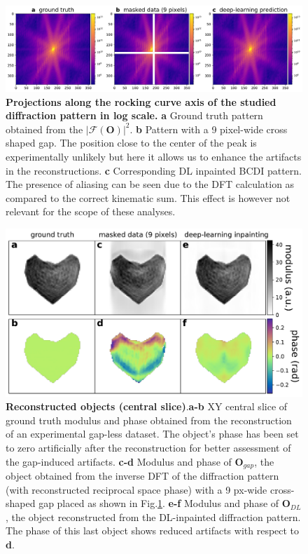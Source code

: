 \begin{figure}[H]
    \centering
    \includegraphics[width=\textwidth]{figures/Inpainting/Carnis_Diffractions_comparison_9px_version2.pdf}
    \caption{\textbf{Projections along the rocking curve axis of the studied diffraction pattern in log scale.} \textbf{a} Ground truth
    pattern obtained from the $|\mathcal{F}(\mathbf{O})|^2$. \textbf{b} Pattern with a 9 pixel-wide cross shaped gap. The position close to the center of 
    the peak is experimentally unlikely but here it allows us to enhance the artifacts in the reconstructions. \textbf{c} 
    Corresponding DL inpainted BCDI pattern. The presence of aliasing can be seen  due to the DFT calculation as compared 
    to the correct kinematic sum. This effect is however not relevant for the scope of these analyses.}
    \label{fig:Carnis_int}
\end{figure}

\begin{figure}[H]
    \centering
    \includegraphics[width=\textwidth]{figures/Inpainting/Real_space_comparison_axis0-1.pdf}
    \caption{\textbf{Reconstructed objects (central slice)}.\textbf{a-b} XY central slice of ground truth modulus 
    and phase obtained from the reconstruction 
    of an experimental gap-less dataset. The object's phase has been set to zero artificially after the reconstruction for 
    better assessment of the gap-induced artifacts. \textbf{c-d} Modulus and phase of  
    $\mathbf{O}_{gap}$, the object obtained from the inverse DFT of the diffraction pattern (with reconstructed reciprocal 
    space phase) with a 9 px-wide cross-shaped gap placed as shown in Fig.\ref{fig:Carnis_int}. \textbf{e-f} Modulus 
    and phase of $\mathbf{O}_{DL}$, the object reconstructed from the DL-inpainted diffraction pattern. The phase of this 
    last object shows reduced artifacts with respect to \textbf{d}.}
    \label{fig:Carnis_obj}
\end{figure} 

